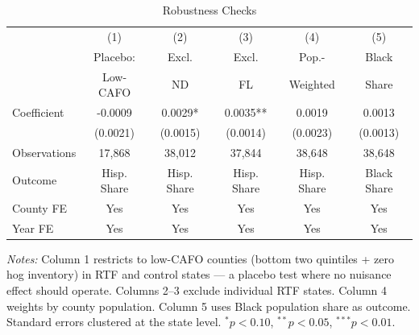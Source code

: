 \begin{table}[htbp]
\centering
\caption{Robustness Checks}
\label{tab:robust}
\begin{tabular}{lccccc}
\hline\hline
& (1) & (2) & (3) & (4) & (5) \\
& Placebo: & Excl. & Excl. & Pop.- & Black \\
& Low-CAFO & ND & FL & Weighted & Share \\
\hline
\addlinespace
Coefficient & -0.0009 & 0.0029* & 0.0035** & 0.0019 & 0.0013 \\
& (0.0021) & (0.0015) & (0.0014) & (0.0023) & (0.0013) \\
\addlinespace
Observations & 17,868 & 38,012 & 37,844 & 38,648 & 38,648 \\
Outcome & Hisp. Share & Hisp. Share & Hisp. Share & Hisp. Share & Black Share \\
\hline
County FE & Yes & Yes & Yes & Yes & Yes \\
Year FE & Yes & Yes & Yes & Yes & Yes \\
\hline\hline
\end{tabular}
\begin{tablenotes}[flushleft]
\item \textit{Notes:} Column 1 restricts to low-CAFO counties (bottom two quintiles + zero hog inventory) in RTF and control states --- a placebo test where no nuisance effect should operate. Columns 2--3 exclude individual RTF states. Column 4 weights by county population. Column 5 uses Black population share as outcome. Standard errors clustered at the state level. $^{*}p<0.10$, $^{**}p<0.05$, $^{***}p<0.01$.
\end{tablenotes}
\end{table}
